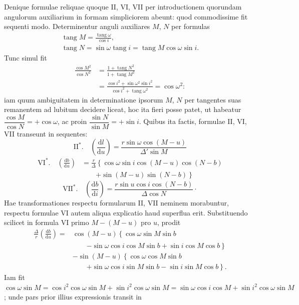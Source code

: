 Denique formulae reliquae quoque II, VI, VII per introductionem quorundam angulorum auxiliarium in formam simpliciorem abeunt: quod commodissime fit sequenti modo. Determinentur anguli auxiliares $M$, $N$ per formulas
\[
\begin{gathered}
\operatorname{tang}M = \frac{\operatorname{tang}\omega}{\cos i},\\
\operatorname{tang}N = \sin\omega\operatorname{tang}i = \operatorname{tang}M\cos\omega\sin i.
\end{gathered}
\]
\noindent Tunc simul fit
\[
\begin{aligned}
\frac{\cos M^2}{\cos N^2}&=\frac{1+\operatorname{tang}N^2}{1+\operatorname{tang}M^2}\\
&=\frac{\cos i^2+\sin\omega^2\sin i^2}{\cos i^2+\operatorname{tang}\omega^2}=\cos\omega^2:
\end{aligned}
\]
\noindent iam quum ambiguitatem in determinatione ipsorum $M$, $N$ per tangentes suas remanentem ad lubitum decidere liceat, hoc ita fieri posse patet, ut habeatur $\dfrac{\cos M}{\cos N}=+\cos\omega$, ac proin $\dfrac{\sin N}{\sin M}=+\sin i$. Quibus ita factis, formulae II, VI, VII transeunt in sequentes:
\[
\mathrm{II}^{*}.\quad \left(\frac{\mathrm{d}l}{\mathrm{d}u}\right) = \frac{r\sin\omega\cos(M-u)}{\Delta'\sin M}
\]
\[
\begin{aligned}
\mathrm{VI}^{*}.\quad \left(\frac{\mathrm{d}b}{\mathrm{d}u}\right)&=\frac{r}{\Delta}\left\{\cos\omega\sin i\cos(M-u)\cos(N-b)\right.\\
&\qquad\left.+\sin(M-u)\sin(N-b)\right\}
\end{aligned}
\]
\[
\mathrm{VII}^{*}.\quad \left(\frac{\mathrm{d}b}{\mathrm{d}i}\right) = \frac{r\sin u\cos i\cos(N-b)}{\Delta\cos N}\mathpunct{\cdot}
\]
\noindent Hae transformationes respectu formularum II, VII neminem morabuntur, respectu formulae VI autem aliqua explicatio haud superflua erit. Substituendo scilicet in formula VI primo $M-(M-u)$ pro $u$, prodit
\[
\begin{aligned}
\frac{\Delta}{r}\left(\frac{\mathrm{d}b}{\mathrm{d}u}\right) = {}&\cos(M-u)\left\{\cos\omega\sin M\sin b\right.\\
&\qquad\left.-\sin\omega\cos i\cos M\sin b+\sin i\cos M\cos b\right\}\\
&-\sin(M-u)\left\{\cos\omega\cos M\sin b\right.\\
&\qquad\left.+\sin\omega\cos i\sin M\sin b-\sin i\sin M\cos b\right\}.
\end{aligned}
\]
\noindent Iam fit $\cos\omega\sin M =\allowbreak \cos i^2\cos\omega\sin M +\allowbreak \sin i^2\cos\omega\sin M =\allowbreak \sin\omega\cos i\cos M +\allowbreak \sin i^2\cos\omega\sin M$; unde pars prior illius expressionis transit in
